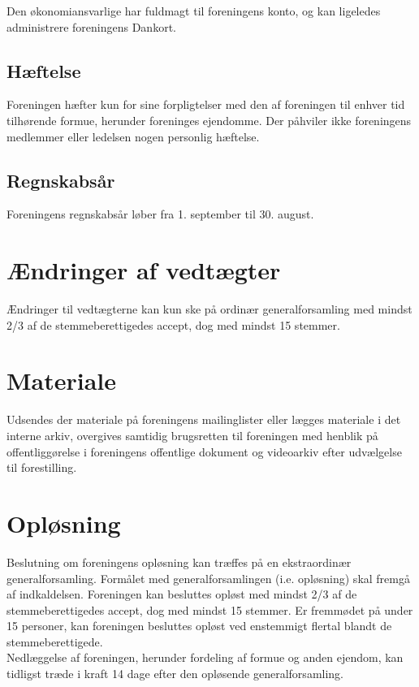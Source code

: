 \documentclass[a4paper,11pt,danish]{article}
\begin{document}
\noindent Den økonomiansvarlige har fuldmagt til foreningens konto, og kan ligeledes administrere foreningens Dankort. 

\subsection{Hæftelse}
Foreningen hæfter kun for sine forpligtelser med den af foreningen til enhver tid tilhørende formue, herunder foreninges ejendomme. Der påhviler ikke foreningens medlemmer eller ledelsen nogen personlig hæftelse.

\subsection{Regnskabsår}
Foreningens regnskabsår løber fra 1. september til 30. august. 

\section{Ændringer af vedtægter}
Ændringer til vedtægterne kan kun ske på ordinær generalforsamling med mindst 2/3 af de stemmeberettigedes accept, dog med mindst 15 stemmer.

\section{Materiale}
Udsendes der materiale på foreningens mailinglister eller lægges materiale i det interne arkiv, overgives samtidig brugsretten til foreningen med henblik på offentliggørelse i foreningens offentlige dokument og videoarkiv efter udvælgelse til forestilling.

\section{Opløsning}
Beslutning om foreningens opløsning kan træffes på en ekstraordinær generalforsamling. Formålet med generalforsamlingen (i.e. opløsning) skal fremgå af indkaldelsen. Foreningen kan besluttes opløst med mindst 2/3 af de stemmeberettigedes accept, dog med mindst 15 stemmer. Er fremmødet på under 15 personer, kan foreningen besluttes opløst ved enstemmigt flertal blandt de stemmeberettigede.\\

\noindent Nedlæggelse af foreningen, herunder fordeling af formue og anden ejendom, kan tidligst træde i kraft 14 dage efter den opløsende generalforsamling.\\
\end{document}

